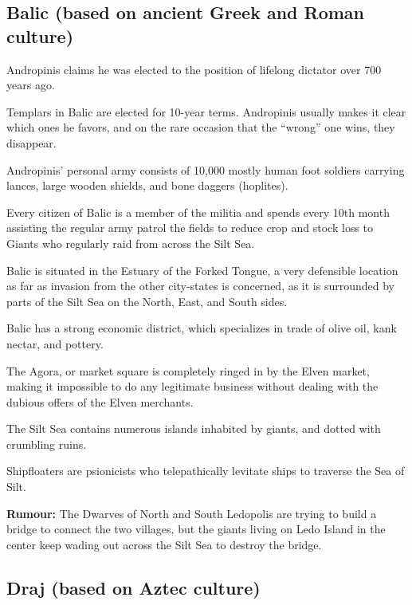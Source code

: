 \begin{multicols}{2}

\subsection{Balic (based on ancient Greek and Roman culture)}

\begin{description}
    \item Andropinis claims he was elected to the position of lifelong dictator over 700 years ago.
    \item Templars in Balic are elected for 10-year terms. Andropinis usually makes it clear which ones he favors, and on the rare occasion that the “wrong” one wins, they disappear.
    \item Andropinis’ personal army consists of 10,000 mostly human foot soldiers carrying lances, large wooden shields, and bone daggers (hoplites).
    \item Every citizen of Balic is a member of the militia and spends every 10th month assisting the regular army patrol the fields to reduce crop and stock loss to Giants who regularly raid from across the Silt Sea.
    \item Balic is situated in the Estuary of the Forked Tongue, a very defensible location as far as invasion from the other city-states is concerned, as it is surrounded by parts of the Silt Sea on the North, East, and South sides.
    \item Balic has a strong economic district, which specializes in trade of olive oil, kank nectar, and pottery.
    \item The Agora, or market square is completely ringed in by the Elven market, making it impossible to do any legitimate business without dealing with the dubious offers of the Elven merchants.
    \item The Silt Sea contains numerous islands inhabited by giants, and dotted with crumbling ruins.
    \item Shipfloaters are psionicists who telepathically levitate ships to traverse the Sea of Silt.
    \item \textbf{Rumour:} The Dwarves of North and South Ledopolis are trying to build a bridge to connect the two villages, but the giants living on Ledo Island in the center keep wading out across the Silt Sea to destroy the bridge.
\end{description}

\subsection{Draj (based on Aztec culture)}


\end{multicols}

